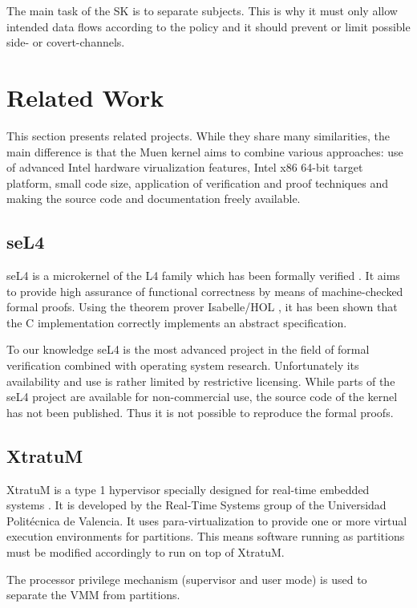 The main task of the SK is to separate subjects. This is why it must only allow
intended data flows according to the policy and it should prevent or limit
possible side- or covert-channels.

\section{Related Work}
This section presents related projects. While they share many similarities, the
main difference is that the Muen kernel aims to combine various approaches: use
of advanced Intel hardware virualization features, Intel x86 64-bit target
platform, small code size, application of verification and proof techniques and
making the source code and documentation freely available.

\subsection{seL4}
seL4 is a microkernel of the L4 \cite{Liedtke:1996:TRM:234215.234473} family
which has been formally verified \cite{Klein_EHACDEEKNSTW_09}. It aims to
provide high assurance of functional correctness by means of machine-checked
formal proofs. Using the theorem prover Isabelle/HOL
\cite{Nipkow-Paulson-Wenzel:2002}, it has been shown that the C implementation
correctly implements an abstract specification.

To our knowledge seL4 is the most advanced project in the field of formal
verification combined with operating system research. Unfortunately its
availability and use is rather limited by restrictive licensing. While parts of
the seL4 project are available for non-commercial use, the source code of the
kernel has not been published. Thus it is not possible to reproduce the formal
proofs.

\subsection{XtratuM}
XtratuM is a type 1 hypervisor specially designed for real-time embedded
systems \cite{xtratum:2009a}. It is developed by the Real-Time Systems group of
the Universidad Politécnica de Valencia. It uses para-virtualization to provide
one or more virtual execution environments for partitions. This means
software running as partitions must be modified accordingly to run on top of
XtratuM.

The processor privilege mechanism (supervisor and user mode) is used to
separate the VMM from partitions.

